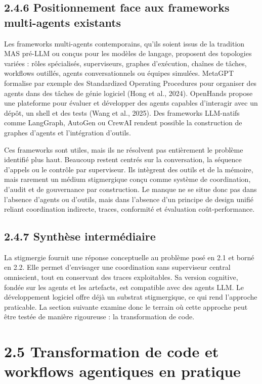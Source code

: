 \subsection{2.4.6 Positionnement face aux frameworks multi-agents existants}\label{positionnement-face-aux-frameworks-multi-agents-existants}

Les frameworks multi-agents contemporains, qu'ils soient issus de la tradition MAS pré-LLM ou conçus pour les modèles de langage, proposent des topologies variées : rôles spécialisés, superviseurs, graphes d'exécution, chaînes de tâches, workflows outillés, agents conversationnels ou équipes simulées. MetaGPT formalise par exemple des Standardized Operating Procedures pour organiser des agents dans des tâches de génie logiciel (Hong et al., 2024). OpenHands propose une plateforme pour évaluer et développer des agents capables d'interagir avec un dépôt, un shell et des tests (Wang et al., 2025). Des frameworks LLM-natifs comme LangGraph, AutoGen ou CrewAI rendent possible la construction de graphes d'agents et l'intégration d'outils.

Ces frameworks sont utiles, mais ils ne résolvent pas entièrement le problème identifié plus haut. Beaucoup restent centrés sur la conversation, la séquence d'appels ou le contrôle par superviseur. Ils intègrent des outils et de la mémoire, mais rarement un médium stigmergique conçu comme système de coordination, d'audit et de gouvernance par construction. Le manque ne se situe donc pas dans l'absence d'agents ou d'outils, mais dans l'absence d'un principe de design unifié reliant coordination indirecte, traces, conformité et évaluation coût-performance.

\subsection{2.4.7 Synthèse intermédiaire}\label{synthuxe8se-intermuxe9diaire-2}

La stigmergie fournit une réponse conceptuelle au problème posé en 2.1 et borné en 2.2. Elle permet d'envisager une coordination sans superviseur central omniscient, tout en conservant des traces exploitables. Sa version cognitive, fondée sur les agents et les artefacts, est compatible avec des agents LLM. Le développement logiciel offre déjà un substrat stigmergique, ce qui rend l'approche praticable. La section suivante examine donc le terrain où cette approche peut être testée de manière rigoureuse : la transformation de code.

\section{2.5 Transformation de code et workflows agentiques en pratique}\label{transformation-de-code-et-workflows-agentiques-en-pratique}


